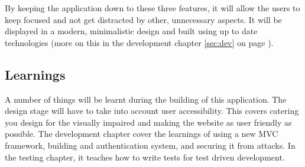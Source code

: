 \noindent
By keeping the application down to these three features, it will allow the users to keep focused and not get distracted by other, unnecessary aspects. It will be displayed in a modern, minimalistic design and built using up to date technologies (more on this in the development chapter \ref{sec:dev} on page \pageref{sec:dev}).\\

\subsection{Learnings}
A number of things will be learnt during the building of this application. The design stage will have to take into account user accessibility. This covers catering you design for the visually impaired and making the website as user friendly as possible. The development chapter cover the learnings of using a new MVC framework, building and authentication system, and securing it from attacks. In the testing chapter, it teaches how to write tests for test driven development.\\

